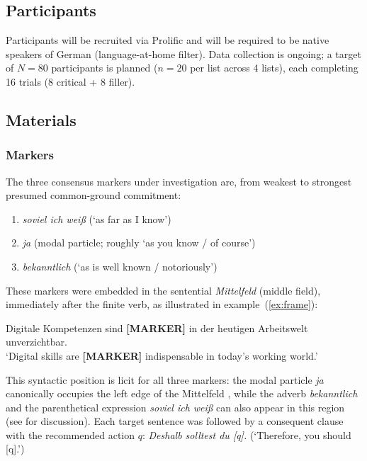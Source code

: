 \documentclass[12pt]{article}
\begin{document}
\subsection{Participants}

Participants will be recruited via Prolific and will be required to be
native speakers of German (language-at-home filter).
Data collection is ongoing; a target of $N = 80$ participants is planned
($n = 20$ per list across 4 lists), each completing 16 trials (8 critical + 8 filler).

\subsection{Materials}

\subsubsection{Markers}

The three consensus markers under investigation are, from weakest to
strongest presumed common-ground commitment:

\begin{enumerate}
  \item \textit{soviel ich wei\ss{}} (`as far as I know')
  \item \textit{ja} (modal particle; roughly `as you know / of course')
  \item \textit{bekanntlich} (`as is well known / notoriously')
\end{enumerate}

These markers were embedded in the sentential \emph{Mittelfeld}
(middle field), immediately after the finite verb, as illustrated in
example~(\ref{ex:frame}):

\begin{exe}
  \ex \label{ex:frame}
  Digitale Kompetenzen sind \textbf{[MARKER]}
  in der heutigen Arbeitswelt unverzichtbar.\\
  `Digital skills are \textbf{[MARKER]} indispensable in today's
  working world.'
\end{exe}

This syntactic position is licit for all three markers: the modal particle
\textit{ja} canonically occupies the left edge of the Mittelfeld
\citep{thurmair1989modalpartikeln}, while the adverb \textit{bekanntlich}
and the parenthetical expression \textit{soviel ich wei\ss{}} can also
appear in this region (see \citealt{jacobs_semantics_1991} for discussion).
Each target sentence was followed by a consequent clause with the
recommended action $q$: \textit{Deshalb solltest du [q].}
(`Therefore, you should [q].')
\end{document}
